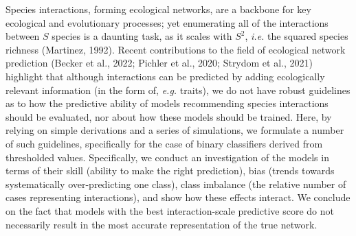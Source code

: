 \documentclass[11pt]{article}
\begin{document}
\clearpage
\thispagestyle{empty}

\vfill

\vfill

\clearpage
\linenumbers
\pagestyle{normal}

Species interactions, forming ecological networks, are a backbone for
key ecological and evolutionary processes; yet enumerating all of the
interactions between \(S\) species is a daunting task, as it scales with
\(S^2\), \emph{i.e.} the squared species richness (Martinez, 1992).
Recent contributions to the field of ecological network prediction
(Becker et al., 2022; Pichler et al., 2020; Strydom et al., 2021)
highlight that although interactions can be predicted by adding
ecologically relevant information (in the form of, \emph{e.g.} traits),
we do not have robust guidelines as to how the predictive ability of
models recommending species interactions should be evaluated, nor about
how these models should be trained. Here, by relying on simple
derivations and a series of simulations, we formulate a number of such
guidelines, specifically for the case of binary classifiers derived from
thresholded values. Specifically, we conduct an investigation of the
models in terms of their skill (ability to make the right prediction),
bias (trends towards systematically over-predicting one class), class
imbalance (the relative number of cases representing interactions), and
show how these effects interact. We conclude on the fact that models
with the best interaction-scale predictive score do not necessarily
result in the most accurate representation of the true network.
\end{document}
